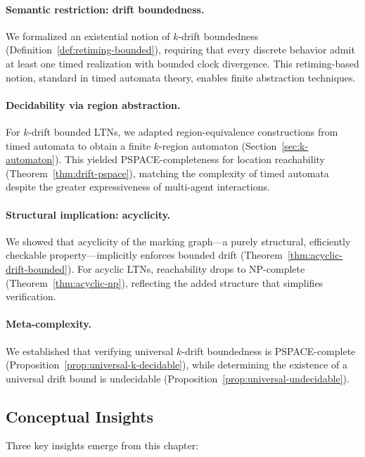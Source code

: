 \paragraph{Semantic restriction: drift boundedness.} We formalized an existential notion of $k$-drift boundedness (Definition~\ref{def:retiming-bounded}), requiring that every discrete behavior admit at least one timed realization with bounded clock divergence. This retiming-based notion, standard in timed automata theory, enables finite abstraction techniques.

\paragraph{Decidability via region abstraction.} For $k$-drift bounded LTNs, we adapted region-equivalence constructions from timed automata to obtain a finite $k$-region automaton (Section~\ref{sec:k-automaton}). This yielded PSPACE-completeness for location reachability (Theorem~\ref{thm:drift-pspace}), matching the complexity of timed automata despite the greater expressiveness of multi-agent interactions.

\paragraph{Structural implication: acyclicity.} We showed that acyclicity of the marking graph—a purely structural, efficiently checkable property—implicitly enforces bounded drift (Theorem~\ref{thm:acyclic-drift-bounded}). For acyclic LTNs, reachability drops to NP-complete (Theorem~\ref{thm:acyclic-np}), reflecting the added structure that simplifies verification.

\paragraph{Meta-complexity.} We established that verifying universal $k$-drift boundedness is PSPACE-complete (Proposition~\ref{prop:universal-k-decidable}), while determining the existence of a universal drift bound is undecidable (Proposition~\ref{prop:universal-undecidable}).

\subsection*{Conceptual Insights}

Three key insights emerge from this chapter:

